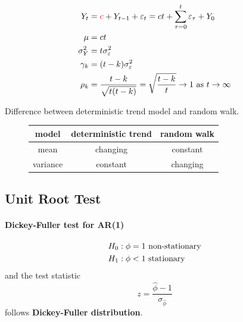 \documentclass[11pt]{article}
\begin{document}
    	    \begin{example}
    	        \begin{align}
    	            Y_t &= \textcolor{red}{c} + Y_{t-1} + \varepsilon_t = ct + \sum_{\tau=0}^{t} \varepsilon_\tau + Y_0 \\
    	            \mu &= ct \\
    	            \sigma_Y^2 &= t \sigma_\varepsilon^2 \\
    	            \gamma_k &= (t-k) \sigma_\varepsilon^2 \\
    	            \rho_k &= \frac{t-k}{\sqrt{t (t-k)}} = \sqrt{\frac{t-k}{t}} \to 1 \text{{ as }} t \to \infty
    	        \end{align}
    	    \end{example}
    	    
    	    \begin{remark}
    	        Difference between deterministic trend model and random walk.
    	        \begin{figure}[h]
    	            \centering
        	        \begin{tabular}{c|c|c}
        	             model & deterministic trend & random walk \\
        	             \hline
        	             mean & changing & constant \\
        	             \hline
        	             variance & constant & changing
        	        \end{tabular}
    	        \end{figure}
    	    \end{remark}
    	    
    	\subsection{Unit Root Test}
    	    \paragraph{Dickey-Fuller test for AR(1)}
    	        \begin{align}
    	            H_0 &: \phi = 1 \text{{ non-stationary}} \\
    	            H_1 &: \phi < 1 \text{{ stationary}}
    	        \end{align}
    	       and the test statistic 
    	       \begin{equation}
    	           z = \frac{\hat{\phi} - 1}{\sigma_{\hat{\phi}}}
    	       \end{equation}
    	       follows \textbf{Dickey-Fuller distribution}.
    	   
\end{document}
